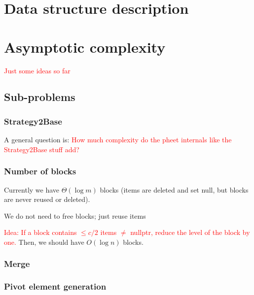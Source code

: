 \documentclass[a4paper,12pt]{article}
\newcommand\todo[1]{\textcolor{red}{#1}}
\renewcommand\O[1]{O\left(#1\right)}
\newcommand\capacity{c}
\begin{document}
\section{Data structure description}\label{sec:ds}


\section{Asymptotic complexity}\label{sec:complexity}
\todo{Just some ideas so far}

\subsection{Sub-problems}\label{sec:complexity:subproblems}

\subsubsection{Strategy2Base}\label{sec:complexity:strategy2base}
A general question is: \todo{How much complexity do the pheet internals like the Strategy2Base stuff add?}

\subsubsection{Number of blocks}\label{sec:complexity:nrblocks}
Currently we have $\Theta\left(\log m\right)$ blocks (items are deleted and set null, but blocks are never reused or deleted).

We do not need to free blocks; just reuse items

\todo{Idea: If a block contains $\leq \capacity/2$ items $\neq$ nullptr, reduce the level of the block by one.}
Then, we should have $\O{\log n}$ blocks.

\subsubsection{Merge}\label{sec:complexity:merge}

\subsubsection{Pivot element generation}\label{sec:complexity:pivotgeneration}
\end{document}
